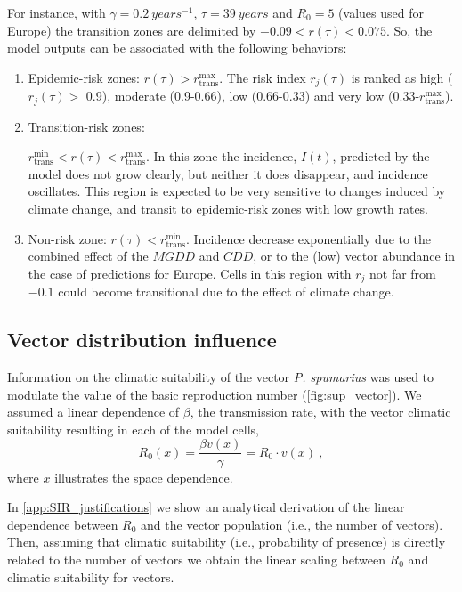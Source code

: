 For instance, with $\gamma=\SI{0.2}{years^{-1}}$, $\tau=\SI{39}{years}$ and
$R_0=5$ (values used for Europe) the transition zones are delimited by
$-0.09<r(\tau)<0.075$. So, the model outputs can be associated with the
following behaviors:
\begin{enumerate}
    \item Epidemic-risk zones: $r(\tau)>r_{\textrm{trans}}^{\textrm{max}}$.
          The risk index $r_j(\tau)$ is ranked as high ($r_j(\tau) >$ 0.9),
          moderate
          (0.9-0.66), low (0.66-0.33) and very low
          (0.33-$r_{\textrm{trans}}^{\textrm{max}}$).
    \item Transition-risk zones:

          $r_{\textrm{trans}}^{\textrm{min}}<r(\tau)<r_{\textrm{trans}}^{\textrm{max}}$.
          In this zone the incidence, $I(t)$, predicted by the model does not
          grow
          clearly, but neither it does disappear, and incidence oscillates.
          This region
          is expected to be very sensitive to changes induced by climate
          change, and
          transit to epidemic-risk zones with low growth rates.
    \item Non-risk zone: $r(\tau)<r_{\textrm{trans}}^{\textrm{min}}$.
          Incidence decrease exponentially due to the combined effect of the
          $MGDD$ and
          $CDD$, or to the (low) vector abundance in the case of predictions
          for Europe.
          Cells in this region with $r_j$ not far from $-0.1$ could become
          transitional
          due to the effect of climate change.
\end{enumerate}

\subsection{Vector distribution influence}\label{app:vector_influence}

Information on the climatic suitability of the vector \textit{P. spumarius}
\cite{Godefroid2021} was used to modulate the value of the basic reproduction
number (\cref{fig:sup_vector}). We assumed a linear dependence of $\beta$, the
transmission rate, with
the vector climatic suitability resulting in each of the model cells,
\begin{equation}
    R_0(x)=\frac{\beta v(x)}{\gamma}=R_0\cdot v(x) \ ,
\end{equation}
where $x$ illustrates the space dependence.

In \cref{app:SIR_justifications} we show an analytical derivation of the
linear dependence between $R_0$ and the vector population (i.e., the number of
vectors). Then, assuming that climatic suitability (i.e., probability of
presence) is directly related to the number of vectors we obtain the linear
scaling between $R_0$ and climatic suitability for vectors.

